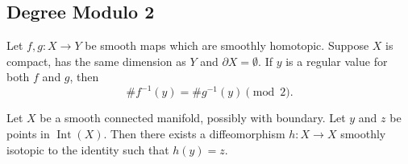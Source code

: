 \documentclass[10pt]{article}
\begin{document}





\subsection{Degree Modulo 2}

\begin{lemma}
    Let $f, g: X \rightarrow Y$ be smooth maps which are smoothly homotopic. Suppose $X$ is compact, has the same dimension as $Y$ and $\partial X=\emptyset$. If $y$ is a regular value for both $f$ and $g$, then
$$
\# f^{-1}(y)=\# g^{-1}(y) \pmod{2}.
$$
\end{lemma}

\begin{lemma}
    Let $X$ be a smooth connected manifold, possibly with boundary. Let $y$ and $z$ be points in $\operatorname{Int}(X)$. Then there exists a diffeomorphism $h: X \rightarrow X$ smoothly isotopic to the identity such that $h(y)=z$. 
\end{lemma}
\end{document}
